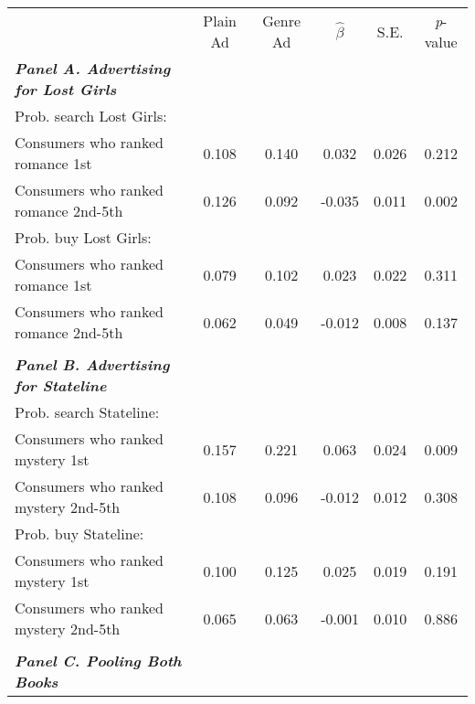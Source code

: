 \begin{center}
\begin{tabular}{lccccc}
\hline \noalign{\smallskip} & Plain Ad & Genre Ad & $\hat{\beta}$ & S.E. & \emph{p}-value\\
\noalign{\smallskip}\hline \noalign{\smallskip}\textbf{\emph{Panel A. Advertising for Lost Girls}} &  &  &  &  & \\
\hspace{5pt} Prob. search Lost Girls: &  &  &  &  & \\
\hspace{5pt} Consumers who ranked romance 1st & 0.108 & 0.140 & 0.032 & 0.026 & 0.212\\
\hspace{5pt} Consumers who ranked romance 2nd-5th & 0.126 & 0.092 & -0.035 & 0.011 & 0.002\\
\hspace{5pt} Prob. buy Lost Girls: &  &  &  &  & \\
\hspace{5pt} Consumers who ranked romance 1st & 0.079 & 0.102 & 0.023 & 0.022 & 0.311\\
\hspace{5pt} Consumers who ranked romance 2nd-5th & 0.062 & 0.049 & -0.012 & 0.008 & 0.137\\
  &  &  &  &  & \\
\textbf{\emph{Panel B. Advertising for Stateline}} &  &  &  &  & \\
\hspace{5pt} Prob. search Stateline: &  &  &  &  & \\
\hspace{5pt} Consumers who ranked mystery 1st & 0.157 & 0.221 & 0.063 & 0.024 & 0.009\\
\hspace{5pt} Consumers who ranked mystery 2nd-5th & 0.108 & 0.096 & -0.012 & 0.012 & 0.308\\
\hspace{5pt} Prob. buy Stateline: &  &  &  &  & \\
\hspace{5pt} Consumers who ranked mystery 1st & 0.100 & 0.125 & 0.025 & 0.019 & 0.191\\
\hspace{5pt} Consumers who ranked mystery 2nd-5th & 0.065 & 0.063 & -0.001 & 0.010 & 0.886\\
  &  &  &  &  & \\
\textbf{\emph{Panel C. Pooling Both Books}} &  &  &  &  & \\

\end{tabular}
\end{center}
